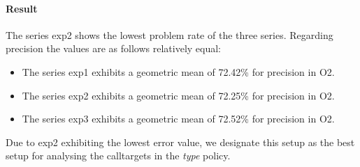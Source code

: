 \paragraph{Result} The series exp2 shows the lowest problem rate of the three series. Regarding precision the values are as follows relatively equal:
\begin{itemize}
\item The series exp1 exhibits a geometric mean of 72.42\% for precision in O2.
\item The series exp2 exhibits a geometric mean of 72.25\% for precision in O2.
\item The series exp3 exhibits a geometric mean of 72.52\% for precision in O2. 
\end{itemize}
Due to exp2 exhibiting the lowest error value, we designate this setup as the best setup for analysing the calltargets in the \textit{type} policy.

